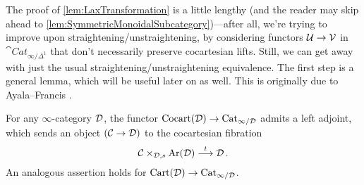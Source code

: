 The proof of \cref{lem:LaxTransformation} is a little lengthy (and the reader may skip ahead to \cref{lem:SymmetricMonoidalSubcategory})---after all, we're trying to improve upon straightening/unstraightening, by considering functors $\mathcal{U}\rightarrow \mathcal{V}$ in $\cat{Cat}_{\infty/\Delta^1}$ that don't necessarily preserve cocartesian lifts. Still, we can get away with just the usual straightening/unstraightening equivalence. The first step is a general lemma, which will be useful later on as well. This is originally due to Ayala--Francis \cite[Theorem~\href{https://arxiv.org/pdf/1702.02681\#theorem.2.30}{2.30}]{AyalaFrancisFibrations}.
\begin{lem}\label{lem:CocartesianReplacement}
	For any $\infty$-category $\mathcal{D}$, the  functor $\mathrm{Cocart}(\mathcal{D})\rightarrow \mathrm{Cat}_{\infty/\mathcal{D}}$ admits a left adjoint, which sends an object $(\mathcal{C}\rightarrow \mathcal{D})$ to the cocartesian fibration
	\begin{equation*}
		\mathcal{C}\times_{\mathcal{D},s}\operatorname{Ar}(\mathcal{D})\overset{t}{\longrightarrow}\mathcal{D}\,.
	\end{equation*}
	An analogous assertion holds for $\mathrm{Cart}(\mathcal{D})\rightarrow \mathrm{Cat}_{\infty/\mathcal{D}}$.
\end{lem}
